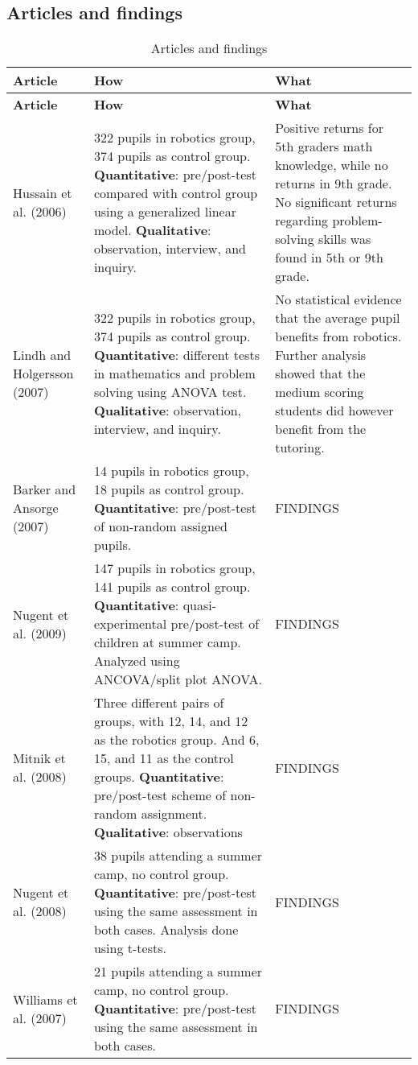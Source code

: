 \subsection*{Articles and findings}
\setlength\LTleft{0px}
\setlength\LTright{0px}
\begin{longtable}{@{\extracolsep{\fill}}p{}p{}@{\hspace{20pt}}p{}}
	\hline \multicolumn{1}{l}{\textbf{Article}} & \multicolumn{1}{l}{\textbf{How}} & \multicolumn{1}{l}{\textbf{What}} \\ \hline\hline
	\endfirsthead
	\hline \multicolumn{1}{l}{\textbf{Article}} & \multicolumn{1}{l}{\textbf{How}} & \multicolumn{1}{l}{\textbf{What}} \\ \hline\hline
	\endhead
	\hline \caption{Articles and findings}\endlastfoot
	Hussain et al. (2006) & 322 pupils in robotics group, 374 pupils as control group. \textbf{Quantitative}: pre/post-test compared with control group using a generalized linear model. \textbf{Qualitative}: observation, interview, and inquiry. & Positive returns for 5th graders math knowledge, while no returns in 9th grade. No significant returns regarding problem-solving skills was found in 5th or 9th grade. \\\hline
	
	Lindh and Holgersson (2007) & 322 pupils in robotics group, 374 pupils as control group. \textbf{Quantitative}: different tests in mathematics and problem solving using ANOVA test. \textbf{Qualitative}: observation, interview, and inquiry. &  No statistical evidence that the average pupil benefits from robotics. Further analysis showed that the medium scoring students did however benefit from the tutoring. \\\hline
	
	Barker and Ansorge (2007) & 14 pupils in robotics group, 18 pupils as control group. \textbf{Quantitative}: pre/post-test of non-random assigned pupils. & FINDINGS \\\hline
	Nugent et al. (2009) & 147 pupils in robotics group, 141 pupils as control group. \textbf{Quantitative}: quasi-experimental pre/post-test of children at summer camp. Analyzed using ANCOVA/split plot ANOVA. & FINDINGS \\\hline
	
	Mitnik et al. (2008) & Three different pairs of groups, with 12, 14, and 12 as the robotics group. And 6, 15, and 11 as the control groups. \textbf{Quantitative}: pre/post-test scheme of non-random assignment. \textbf{Qualitative}: observations  & FINDINGS \\\hline
	
	Nugent et al. (2008) & 38 pupils attending a summer camp, no control group. \textbf{Quantitative}: pre/post-test using the same assessment in both cases. Analysis done using t-tests. & FINDINGS \\\hline
	
	Williams et al. (2007) & 21 pupils attending a summer camp, no control group. \textbf{Quantitative}: pre/post-test using the same assessment in both cases.  & FINDINGS \\\hline
\end{longtable}
